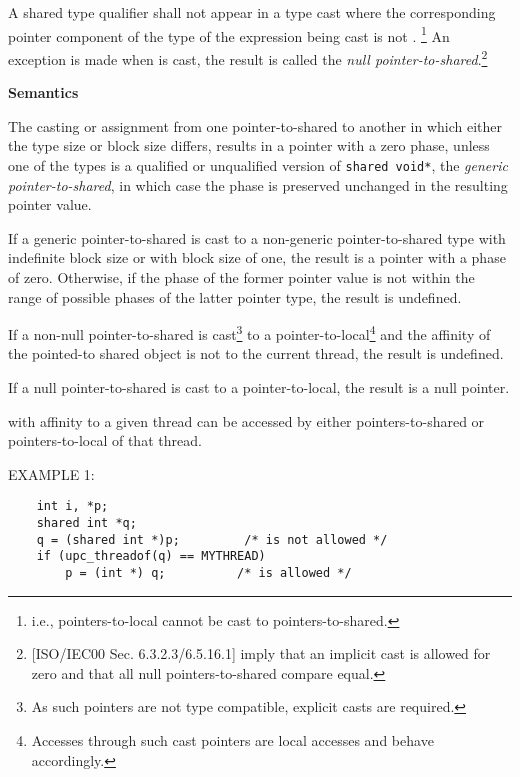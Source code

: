 \npf A shared type qualifier shall not appear in a type cast
    where the corresponding pointer component of the type of the expression
    being cast is not .
    \footnote{i.e., pointers-to-local
    cannot be cast to pointers-to-shared.}  An exception is made when 
    is cast, the result is called the {\em null 
    pointer-to-shared}.\footnote{[ISO/IEC00 Sec.
    6.3.2.3/6.5.16.1] imply that an implicit cast is allowed for zero
    and that all null pointers-to-shared compare equal.}

{\bf Semantics} 

\np The casting or assignment from one pointer-to-shared 
    to another in which either the type size or block size differs,
    results in 
    a pointer with a zero phase, unless one of the types is a qualified or
    unqualified version of {\tt shared void*}, the {\em generic pointer-to-shared},
    in which case the phase is preserved unchanged in the resulting
    pointer value.
    
\np If a generic pointer-to-shared is cast to a non-generic 
     pointer-to-shared type with indefinite block size or with block size of 
     one, the result is a pointer with a phase of zero.  Otherwise, if the
     phase of the former pointer value is not within the range of possible
     phases of the latter pointer type, the result is undefined.
  
\np If a non-null pointer-to-shared is cast\footnote{As such pointers
     are not type compatible, explicit casts are required.} to a
     pointer-to-local\footnote{Accesses through such cast pointers are
     local accesses and behave accordingly.} and the affinity
     of  the
     pointed-to shared object is not to the current thread, the result
     is undefined.
     
\np If a null pointer-to-shared is cast to a pointer-to-local,
     the result is a null pointer.    
       
\np {} with
    affinity to a given thread 
    can be accessed by either pointers-to-shared or pointers-to-local of
    that thread.

\np EXAMPLE 1: 
\begin{verbatim}
    int i, *p; 
    shared int *q; 
    q = (shared int *)p;         /* is not allowed */ 
    if (upc_threadof(q) == MYTHREAD)
        p = (int *) q;          /* is allowed */ 
\end{verbatim}

